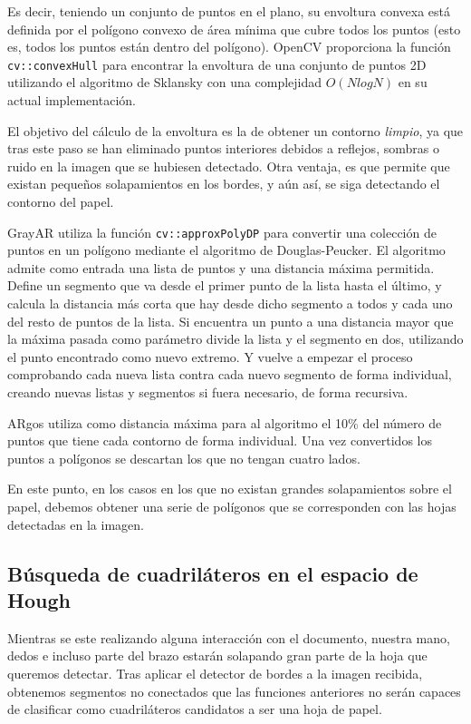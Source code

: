 Es decir, teniendo un conjunto de puntos en el plano, su envoltura convexa está definida por el
polígono convexo de área mínima que cubre todos los puntos (esto es, todos los puntos están dentro
del polígono). OpenCV proporciona la función \texttt{cv::convexHull} para encontrar la envoltura de
una conjunto de puntos 2D utilizando el algoritmo de Sklansky con una complejidad $O(N log N)$ en su
actual implementación.

El objetivo del cálculo de la envoltura es la de obtener un contorno \emph{limpio}, ya que tras este
paso se han eliminado puntos interiores debidos a reflejos, sombras o ruido en la imagen que se hubiesen
detectado. Otra ventaja, es que permite que existan pequeños solapamientos en los bordes, y aún así, se
siga detectando el contorno del papel.

GrayAR utiliza la función \texttt{cv::approxPolyDP}  para convertir una colección de puntos en un
polígono mediante el algoritmo de Douglas-Peucker. El algoritmo admite como entrada una lista de
puntos y una distancia máxima permitida. Define un segmento que va desde el primer punto de la lista
hasta el último, y calcula la distancia más corta que hay desde dicho segmento a todos y cada uno
del resto de puntos de la lista. Si encuentra un punto a una distancia mayor que la máxima pasada
como parámetro divide la lista y el segmento en dos, utilizando el punto encontrado como nuevo
extremo. Y vuelve a empezar el proceso comprobando cada nueva lista contra cada nuevo segmento de
forma individual, creando nuevas listas y segmentos si fuera necesario, de forma recursiva.

ARgos utiliza como distancia máxima para al algoritmo el 10\% del número de puntos que tiene cada
contorno de forma individual. Una vez convertidos los puntos a polígonos se descartan los que no
tengan cuatro lados.

En este punto, en los casos en los que no existan grandes solapamientos sobre el papel, debemos
obtener una serie de polígonos que se corresponden con las hojas detectadas en la imagen.

\subsection{Búsqueda de cuadriláteros en el espacio de Hough}
Mientras se este realizando alguna interacción con el documento, nuestra mano, dedos e incluso parte
del brazo estarán solapando gran parte de la hoja que queremos detectar. Tras aplicar el detector de
bordes a la imagen recibida, obtenemos segmentos no conectados que las funciones anteriores no serán
capaces de clasificar como cuadriláteros candidatos a ser una hoja de papel.

